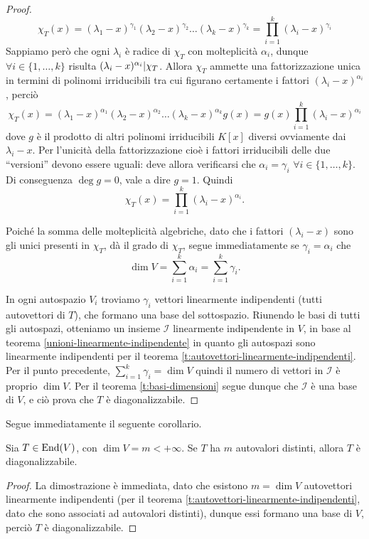 \begin{proof}
	\begin{equation}
		\chi_T(x)=(\lambda_1-x)^{\gamma_1}(\lambda_2-x)^{\gamma_2}\dots(\lambda_k-x)^{\gamma_k}=\prod_{i=1}^k(\lambda_i-x)^{\gamma_i}
	\end{equation}
	Sappiamo però che ogni $\lambda_i$ è radice di $\chi_T$ con molteplicità $\alpha_i$, dunque $\forall i\in\{1,\dots,k\}$ risulta $(\lambda_i-x)^{\alpha_i}|\chi_T$.
	Allora $\chi_T$ ammette una fattorizzazione unica in termini di polinomi irriducibili tra cui figurano certamente i fattori $(\lambda_i-x)^{\alpha_i}$, perciò
	\begin{equation*}
		\chi_T(x)=(\lambda_1-x)^{\alpha_1}(\lambda_2-x)^{\alpha_2}\dots(\lambda_k-x)^{\alpha_k}g(x)=g(x)\prod_{i=1}^k(\lambda_i-x)^{\alpha_i}
	\end{equation*}
	dove $g$ è il prodotto di altri polinomi irriducibili $K[x]$ diversi ovviamente dai $\lambda_i-x$.
Per l'unicità della fattorizzazione cioè i fattori irriducibili delle due ``versioni'' devono essere uguali: deve allora verificarsi che $\alpha_i=\gamma_i$ $\forall i\in\{1,\dots,k\}$.
	Di conseguenza $\deg g=0$, vale a dire $g=1$.
	Quindi
	\begin{equation*}
		\chi_T(x)=\prod_{i=1}^k(\lambda_i-x)^{\alpha_i}.
	\end{equation*}

	Poich\'e la somma delle molteplicità algebriche, dato che i fattori $(\lambda_i-x)$ sono gli unici presenti in $\chi_T$, dà il grado di $\chi_T$, segue immediatamente se $\gamma_i=\alpha_i$ che
	\begin{equation}
		\dim V=\sum_{i=1}^k\alpha_i=\sum_{i=1}^k\gamma_i.
	\end{equation}

	In ogni autospazio $V_i$ troviamo $\gamma_i$ vettori linearmente indipendenti (tutti autovettori di $T$), che formano una base del sottospazio.
	Riunendo le basi di tutti gli autospazi, otteniamo un insieme $\mathcal I$ linearmente indipendente in $V$, in base al teorema \ref{unioni-linearmente-indipendente} %
	in quanto gli autospazi sono linearmente indipendenti per il teorema \ref{t:autovettori-linearmente-indipendenti}.
	Per il punto precedente, $\sum_{i=1}^k\gamma_i=\dim V$ quindi il numero di vettori in $\mathcal I$ è proprio $\dim V$.
	Per il teorema \ref{t:basi-dimensioni} segue dunque che $\mathcal I$ è una base di $V$, e ciò prova che $T$ è diagonalizzabile.
\end{proof}
Segue immediatamente il seguente corollario.
\begin{corollario}
	Sia $T\in \operatorname{End}(V)$, con $\dim V=m<+\infty$.
	Se $T$ ha $m$ autovalori distinti, allora $T$ è diagonalizzabile.
\end{corollario}
\begin{proof}
	La dimostrazione è immediata, dato che esistono $m=\dim V$ autovettori linearmente indipendenti (per il teorema \ref{t:autovettori-linearmente-indipendenti}, dato che sono associati ad autovalori distinti), dunque essi formano una base di $V$, perciò $T$ è diagonalizzabile.
\end{proof}

